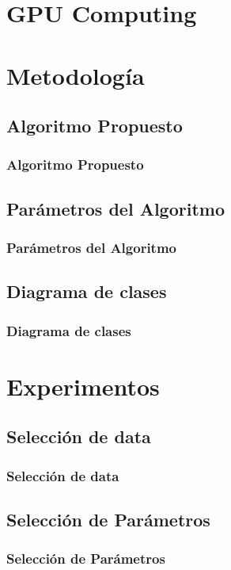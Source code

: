 \documentclass{beamer}
\begin{document}
	\section{GPU Computing}
	\section{Metodología}
        \subsection{Algoritmo Propuesto}
            \begin{frame}
            \frametitle{Algoritmo Propuesto}
            \end{frame}
        \subsection{Parámetros del Algoritmo}
            \begin{frame}
            \frametitle{Parámetros del Algoritmo}
            \end{frame}
        \subsection{Diagrama de clases}
            \begin{frame}
            \frametitle{Diagrama de clases}
            \end{frame}
    \section{Experimentos}
        \subsection{Selección de data}
            \begin{frame}
            \frametitle{Selección de data} 
            \end{frame}
        \subsection{Selección de Parámetros}
            \begin{frame}
            \frametitle{Selección de Parámetros}
            \end{frame}
\end{document}
